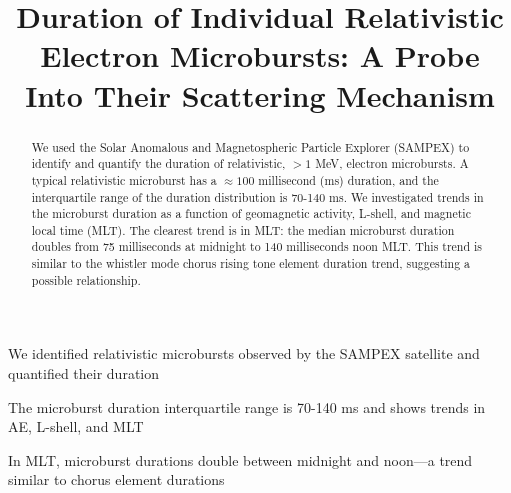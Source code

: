 \documentclass[draft]{agujournal2019}
\begin{document}
%
%



\title{Duration of Individual Relativistic Electron Microbursts: A Probe Into Their Scattering Mechanism}






\begin{keypoints}
\item We identified relativistic microbursts observed by the SAMPEX satellite and quantified their duration
\item The microburst duration interquartile range is 70-140 ms and shows trends in AE, L-shell, and MLT
\item In MLT, microburst durations double between midnight and noon---a trend similar to chorus element durations
\end{keypoints}

\begin{abstract}
We used the Solar Anomalous and Magnetospheric Particle Explorer (SAMPEX) to identify and quantify the duration of relativistic, $>1$ MeV, electron microbursts. A typical relativistic microburst has a $\approx 100$ millisecond (ms) duration, and the interquartile range of the duration distribution is 70-140 ms. We investigated trends in the microburst duration as a function of geomagnetic activity, L-shell, and magnetic local time (MLT). The clearest trend is in MLT: the median microburst duration doubles from 75 milliseconds at midnight to 140 milliseconds noon MLT. This trend is similar to the whistler mode chorus rising tone element duration trend, suggesting a possible relationship.
\end{abstract}
\end{document}
